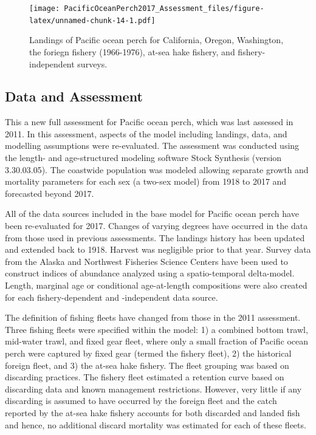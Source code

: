 \documentclass[12pt,]{article}
\begin{document}
\FloatBarrier

\begin{figure}
\centering
\texttt{[image: PacificOceanPerch2017\_Assessment\_files/figure-latex/unnamed-chunk-14-1.pdf]}
\caption{Landings of Pacific ocean perch for California, Oregon,
Washington, the foriegn fishery (1966-1976), at-sea hake fishery, and
fishery-independent surveys. \label{fig:Exec_catch1}}
\end{figure}

\FloatBarrier

\subsection*{Data and Assessment}\label{data-and-assessment}

This a new full assessment for Pacific ocean perch, which was last
assessed in 2011. In this assessment, aspects of the model including
landings, data, and modelling assumptions were re-evaluated. The
assessment was conducted using the length- and age-structured modeling
software Stock Synthesis (version 3.30.03.05). The coastwide population
was modeled allowing separate growth and mortality parameters for each
sex (a two-sex model) from 1918 to 2017 and forecasted beyond 2017.

All of the data sources included in the base model for Pacific ocean
perch have been re-evaluated for 2017. Changes of varying degrees have
occurred in the data from those used in previous assessments. The
landings history has been updated and extended back to 1918. Harvest was
negligible prior to that year. Survey data from the Alaska and Northwest
Fisheries Science Centers have been used to construct indices of
abundance analyzed using a spatio-temporal delta-model. Length, marginal
age or conditional age-at-length compositions were also created for each
fishery-dependent and -independent data source.

The definition of fishing fleets have changed from those in the 2011
assessment. Three fishing fleets were specified within the model: 1) a
combined bottom trawl, mid-water trawl, and fixed gear fleet, where only
a small fraction of Pacific ocean perch were captured by fixed gear
(termed the fishery fleet), 2) the historical foreign fleet, and 3) the
at-sea hake fishery. The fleet grouping was based on discarding
practices. The fishery fleet estimated a retention curve based on
discarding data and known management restrictions. However, very little
if any discarding is assumed to have occurred by the foreign fleet and
the catch reported by the at-sea hake fishery accounts for both
discarded and landed fish and hence, no additional discard mortality was
estimated for each of these fleets.
\end{document}
